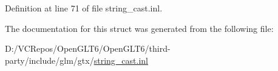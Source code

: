 Definition at line 71 of file string\+\_\+cast.\+inl.



The documentation for this struct was generated from the following file\+:\begin{DoxyCompactItemize}
\item 
D\+:/\+V\+C\+Repos/\+Open\+G\+L\+T6/\+Open\+G\+L\+T6/third-\/party/include/glm/gtx/\mbox{\hyperlink{string__cast_8inl}{string\+\_\+cast.\+inl}}\end{DoxyCompactItemize}

